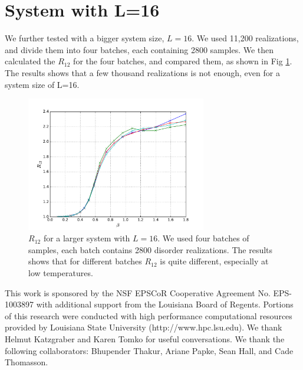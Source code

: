 \section{System with L=16}

We further tested with a bigger system size, $L=16$. We used 11,200 realizations,
and divide them into four batches, each containing 2800 samples. We then calculated
the $R_{12}$ for the four batches, and compared them, as shown in Fig \ref{fig:l16_r12}. 
The results shows that a few thousand realizations is not enough, even for a 
system size of L=16. 


\begin{figure}[ht]
  \centering
  \includegraphics[width=0.7\textwidth]{img/l16_r12.pdf}
  \caption{$R_{12}$ for a larger system with $L=16$. We used four batches of samples,
each batch contains 2800 disorder realizations. The results shows that for
different batches $R_{12}$ is quite different, especially at low temperatures.
}
\label{fig:l16_r12}
\end{figure}


This work is sponsored by the NSF EPSCoR Cooperative Agreement No. EPS-1003897 with additional support 
from the Louisiana Board of Regents. Portions of this research were conducted with high performance computational resources provided by 
Louisiana State University (http://www.hpc.lsu.edu). We thank Helmut Katzgraber and Karen 
Tomko for useful conversations. We thank the following collaborators: Bhupender Thakur, Ariane Papke, Sean Hall, and Cade Thomasson. 


